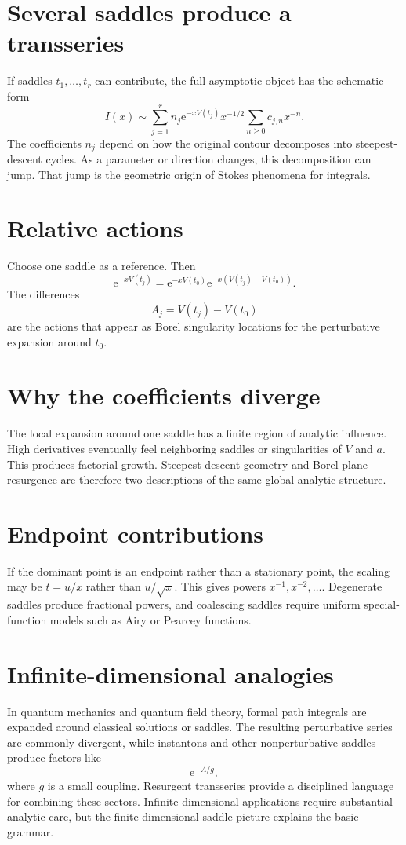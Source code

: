 \documentclass[11pt,openany]{book}
\theoremstyle{plain}
\theoremstyle{definition}
\theoremstyle{remark}
\newcommand{\e}{\mathrm{e}}
\begin{document}
\section{Several saddles produce a transseries}
If saddles $t_1,\ldots,t_r$ can contribute, the full asymptotic object has the schematic form
\[
  I(x)\sim
  \sum_{j=1}^r n_j
  \e^{-xV(t_j)}x^{-1/2}
  \sum_{n\ge0}c_{j,n}x^{-n}.
\]
The coefficients $n_j$ depend on how the original contour decomposes into steepest-descent cycles. As a parameter or direction changes, this decomposition can jump. That jump is the geometric origin of Stokes phenomena for integrals.

\section{Relative actions}
Choose one saddle as a reference. Then
\[
  \e^{-xV(t_j)}
  =\e^{-xV(t_0)}
   \e^{-x(V(t_j)-V(t_0))}.
\]
The differences
\[
  A_j=V(t_j)-V(t_0)
\]
are the actions that appear as Borel singularity locations for the perturbative expansion around $t_0$.

\section{Why the coefficients diverge}
The local expansion around one saddle has a finite region of analytic influence. High derivatives eventually feel neighboring saddles or singularities of $V$ and $a$. This produces factorial growth. Steepest-descent geometry and Borel-plane resurgence are therefore two descriptions of the same global analytic structure.

\section{Endpoint contributions}
If the dominant point is an endpoint rather than a stationary point, the scaling may be $t=u/x$ rather than $u/\sqrt{x}$. This gives powers $x^{-1},x^{-2},\ldots$. Degenerate saddles produce fractional powers, and coalescing saddles require uniform special-function models such as Airy or Pearcey functions.

\section{Infinite-dimensional analogies}
In quantum mechanics and quantum field theory, formal path integrals are expanded around classical solutions or saddles. The resulting perturbative series are commonly divergent, while instantons and other nonperturbative saddles produce factors like
\[
  \e^{-A/g},
\]
where $g$ is a small coupling. Resurgent transseries provide a disciplined language for combining these sectors. Infinite-dimensional applications require substantial analytic care, but the finite-dimensional saddle picture explains the basic grammar.
\end{document}
